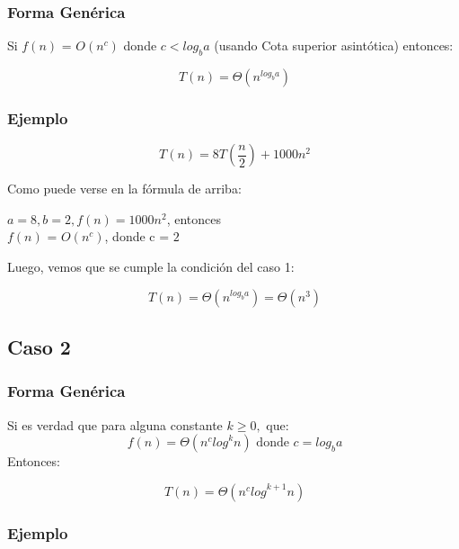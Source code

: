 \documentclass[12pt]{article} %
\begin{document}
\subsubsection{Forma Genérica}
\justify Si $f(n)$ = $O({n}^{c})$ donde $c < {log}_{b} a$ (usando Cota superior asintótica) entonces:

\begin{equation*}
    \label{eq:ecuacion2}
    \ T(n)=\Theta ({n}^{{log}_{b}a})
\end{equation*}

\subsubsection*{Ejemplo}

\begin{equation*}
    \label{eq:ecuacion3}
    \ T(n)=8 T \left(\frac{n}{2}\right) + 1000{{n}^{2}}
\end{equation*}

\justify Como puede verse en la fórmula de arriba:

$a = 8, b = 2, f(n) = 1000 {n}^{2} $, entonces \\  $f(n)$ = $O({n}^{c})$, donde $ \text{c = 2}$

\justify Luego, vemos que se cumple la condición del caso 1:

\begin{equation*}
    \label{eq:ecuacion4}
    \ T(n)=\Theta ({n}^{{log}_{b}a}) = \Theta ({n}^{3})
\end{equation*}

\subsection{Caso 2}
\subsubsection{Forma Genérica}
\justify Si es verdad que para alguna constante $k \geq 0,$ que:
\begin{equation*}
    \label{eq:ecuacion4}
    \ f(n)=\Theta ({n}^{c} {log}^{k} n) \text{   donde  } c= {log}_{b} a
\end{equation*}
Entonces:

\begin{equation*}
    \label{eq:ecuacion5}
    \ T(n)=\Theta ({n}^{c} {log}^{k+1} n)
\end{equation*}

\subsubsection*{Ejemplo}
\end{document}
